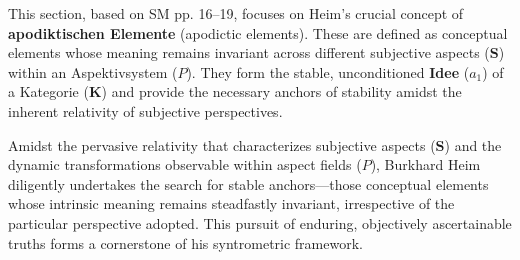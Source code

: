 \documentclass[12pt]{article}
\newcommand{\kategorie}{\bm{K}}
\newcommand{\conceptualsyndrome}{a}
\newcommand{\aspektivsystem}{P}
\begin{document}
This section, based on SM pp. 16--19, focuses on Heim's crucial concept of \textbf{apodiktischen Elemente} (apodictic elements). These are defined as conceptual elements whose meaning remains invariant across different subjective aspects (\(\mathbf{S}\)) within an Aspektivsystem (\(\aspektivsystem\)). They form the stable, unconditioned \textbf{Idee} (\(\conceptualsyndrome_1\)) of a Kategorie (\(\kategorie\)) and provide the necessary anchors of stability amidst the inherent relativity of subjective perspectives.

Amidst the pervasive relativity that characterizes subjective aspects (\(\mathbf{S}\)) and the dynamic transformations observable within aspect fields (\(\aspektivsystem\)), Burkhard Heim diligently undertakes the search for stable anchors—those conceptual elements whose intrinsic meaning remains steadfastly invariant, irrespective of the particular perspective adopted. This pursuit of enduring, objectively ascertainable truths forms a cornerstone of his syntrometric framework. 
\end{document}
